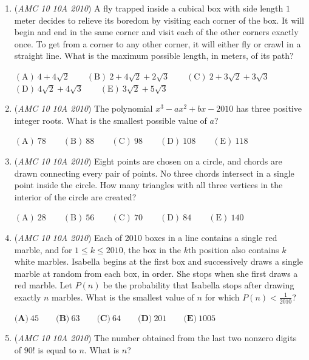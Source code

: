 \begin{enumerate}
	\item (\textit{AMC 10 10A 2010}) A fly trapped inside a cubical box with side length $1$ meter decides to relieve its boredom by visiting each corner of the box. It will begin and end in the same corner and visit each of the other corners exactly once. To get from a corner to any other corner, it will either fly or crawl in a straight line. What is the maximum possible length, in meters, of its path?


 $\mathrm{(A)}\ 4+4\sqrt{2} \qquad \mathrm{(B)}\ 2+4\sqrt{2}+2\sqrt{3} \qquad \mathrm{(C)}\ 2+3\sqrt{2}+3\sqrt{3}$
$\mathrm{(D)}\ 4\sqrt{2}+4\sqrt{3} \qquad \mathrm{(E)}\ 3\sqrt{2}+5\sqrt{3}$


	\item (\textit{AMC 10 10A 2010}) The polynomial $x^3 -ax^2 + bx -2010$ has three positive integer roots. What is the smallest possible value of $a$?


 

$\mathrm{(A)}\ 78 \qquad \mathrm{(B)}\ 88 \qquad \mathrm{(C)}\ 98 \qquad \mathrm{(D)}\ 108 \qquad \mathrm{(E)}\ 118$


	\item (\textit{AMC 10 10A 2010}) Eight points are chosen on a circle, and chords are drawn connecting every pair of points. No three chords intersect in a single point inside the circle. How many triangles with all three vertices in the interior of the circle are created?


 $\mathrm{(A)}\ 28 \qquad \mathrm{(B)}\ 56 \qquad \mathrm{(C)}\ 70 \qquad \mathrm{(D)}\ 84 \qquad \mathrm{(E)}\ 140$


	\item (\textit{AMC 10 10A 2010}) Each of 2010 boxes in a line contains a single red marble, and for $1 \le k \le 2010$, the box in the $k\text{th}$ position also contains $k$ white marbles. Isabella begins at the first box and successively draws a single marble at random from each box, in order. She stops when she first draws a red marble. Let $P(n)$ be the probability that Isabella stops after drawing exactly $n$ marbles. What is the smallest value of $n$ for which $P(n) < \frac{1}{2010}$?


 $\textbf{(A)}\ 45 \qquad \textbf{(B)}\ 63 \qquad \textbf{(C)}\ 64 \qquad \textbf{(D)}\ 201 \qquad \textbf{(E)}\ 1005$


	\item (\textit{AMC 10 10A 2010}) The number obtained from the last two nonzero digits of $90!$ is equal to $n$. What is $n$?



\end{enumerate}
